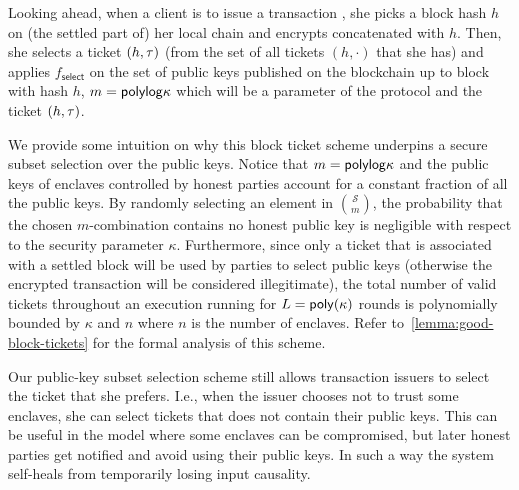 Looking ahead, when a client is to issue a transaction \tx, she picks a block hash $h$ on (the settled part of) her local chain \chainLocal and encrypts \tx concatenated with $h$.
%
Then, she selects a ticket $(h, \mathsf{\tau})$ (from the set of all tickets $(h, \cdot)$ that she has) and applies $f_{\mathsf{select}}$ on the set of public keys published on the blockchain up to block with hash $h$, $m = \mathsf{polylog} \kappa$ which will be a parameter of the protocol and the ticket $(h, \mathsf{\tau})$.

We provide some intuition on why this block ticket scheme underpins a secure subset selection over the public keys.
%
Notice that $m = \mathsf{polylog} \kappa$ and the public keys of enclaves controlled by honest parties account for a constant fraction of all the public keys.
%
By randomly selecting an element in $\binom{\mathcal{S}}{m}$, the probability that the chosen $m$-combination contains no honest public key is negligible with respect to the security parameter $\kappa$.
%
Furthermore, since only a ticket that is associated with a settled block will be used by parties to select public keys (otherwise the encrypted transaction will be considered illegitimate), the total number of valid tickets throughout an execution running for $L = \mathsf{poly}(\kappa)$ rounds is polynomially bounded by $\kappa$ and $n$ where $n$ is the number of enclaves.
%
Refer to~\cref{lemma:good-block-tickets} for the formal analysis of this scheme.

\begin{remark}
	Our public-key subset selection scheme still allows transaction issuers to select the ticket that she prefers.
	I.e., when the issuer chooses not to trust some enclaves, she can select tickets that does not contain their public keys.
	This can be useful in the model where some enclaves can be compromised, but later honest parties get notified and avoid using their public keys.
	In such a way the system self-heals from temporarily losing input causality.
\end{remark}

